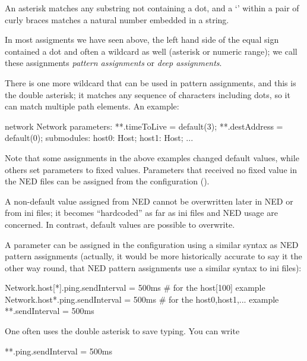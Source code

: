 An asterisk matches any substring not containing a dot, and a `'
within a pair of curly braces matches a natural number embedded in a
string.

In most assigments we have seen above, the left hand side of the equal sign
contained a dot and often a wildcard as well (asterisk or numeric range);
we call these assignments \textit{pattern assignments} or \textit{deep
assignments}.

There is one more wildcard that can be used in pattern assignments, and
this is the double asterisk; it matches any sequence of characters
including dots, so it can match multiple path elements. An example:

\begin{ned}
network Network
{
    parameters:
        **.timeToLive = default(3);
        **.destAddress = default(0);
    submodules:
        host0: Host;
        host1: Host;
        ...
}
\end{ned}

Note that some assignments in the above examples changed default values,
while others set parameters to fixed values. Parameters that received no
fixed value in the NED files can be assigned from the configuration
().

\begin{important}
    A non-default value assigned from NED cannot be overwritten later in
    NED or from ini files; it becomes ``hardcoded'' as far as ini files
    and NED usage are concerned. In contrast, default values are possible
    to overwrite.
\end{important}

A parameter can be assigned in the configuration using a similar syntax as
NED pattern assignments (actually, it would be more historically accurate
to say it the other way round, that NED pattern assignments use a similar
syntax to ini files):


\begin{inifile}
Network.host[*].ping.sendInterval = 500ms  # for the host[100] example
Network.host*.ping.sendInterval = 500ms    # for the host0,host1,... example
**.sendInterval = 500ms
\end{inifile}

One often uses the double asterisk to save typing. You can write

\begin{inifile}
**.ping.sendInterval = 500ms
\end{inifile}

